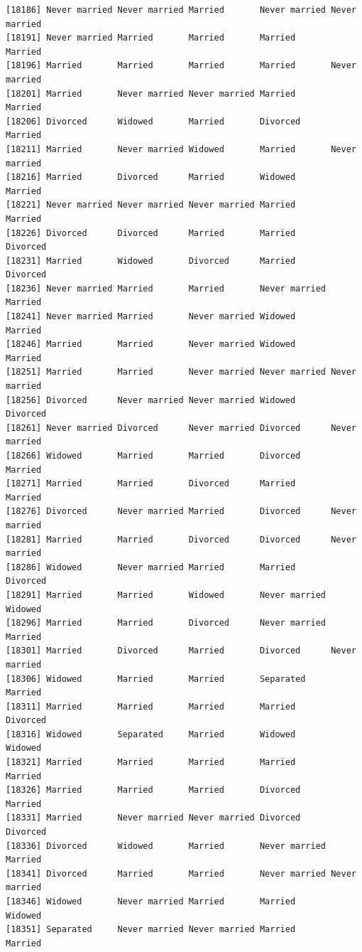 \documentclass[
  letterpaper,
  DIV=11,
  numbers=noendperiod,
  oneside]{scrartcl}
\begin{document}
\begin{verbatim}
[18186] Never married Never married Married       Never married Never married
[18191] Never married Married       Married       Married       Married      
[18196] Married       Married       Married       Married       Never married
[18201] Married       Never married Never married Married       Married      
[18206] Divorced      Widowed       Married       Divorced      Married      
[18211] Married       Never married Widowed       Married       Never married
[18216] Married       Divorced      Married       Widowed       Married      
[18221] Never married Never married Never married Married       Married      
[18226] Divorced      Divorced      Married       Married       Divorced     
[18231] Married       Widowed       Divorced      Married       Divorced     
[18236] Never married Married       Married       Never married Married      
[18241] Never married Married       Never married Widowed       Married      
[18246] Married       Married       Never married Widowed       Married      
[18251] Married       Married       Never married Never married Never married
[18256] Divorced      Never married Never married Widowed       Divorced     
[18261] Never married Divorced      Never married Divorced      Never married
[18266] Widowed       Married       Married       Divorced      Married      
[18271] Married       Married       Divorced      Married       Married      
[18276] Divorced      Never married Married       Divorced      Never married
[18281] Married       Married       Divorced      Divorced      Never married
[18286] Widowed       Never married Married       Married       Divorced     
[18291] Married       Married       Widowed       Never married Widowed      
[18296] Married       Married       Divorced      Never married Married      
[18301] Married       Divorced      Married       Divorced      Never married
[18306] Widowed       Married       Married       Separated     Married      
[18311] Married       Married       Married       Married       Divorced     
[18316] Widowed       Separated     Married       Widowed       Widowed      
[18321] Married       Married       Married       Married       Married      
[18326] Married       Married       Married       Divorced      Married      
[18331] Married       Never married Never married Divorced      Divorced     
[18336] Divorced      Widowed       Married       Never married Married      
[18341] Divorced      Married       Married       Never married Never married
[18346] Widowed       Never married Married       Married       Widowed      
[18351] Separated     Never married Never married Married       Married      

\end{verbatim}
\end{document}
